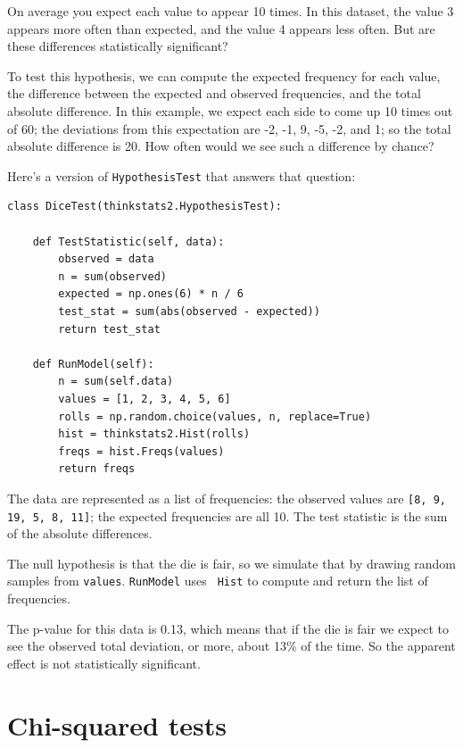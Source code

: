 \documentclass[12pt]{book}
\begin{document}
On average you expect each value to appear 10 times.  In this
dataset, the value 3 appears more often than expected, and the value 4
appears less often.  But are these differences statistically
significant?
   

To test this hypothesis, we can compute the expected frequency for
each value, the difference between the expected and observed
frequencies, and the total absolute difference.  In this
example, we expect each side to come up 10 times out of 60; the
deviations from this expectation are -2, -1, 9, -5, -2, and 1; so the
total absolute difference is 20.  How often would we see such a
difference by chance?

Here's a version of {\tt HypothesisTest} that answers that question:

\begin{verbatim}
class DiceTest(thinkstats2.HypothesisTest):

    def TestStatistic(self, data):
        observed = data
        n = sum(observed)
        expected = np.ones(6) * n / 6
        test_stat = sum(abs(observed - expected))
        return test_stat

    def RunModel(self):
        n = sum(self.data)
        values = [1, 2, 3, 4, 5, 6]
        rolls = np.random.choice(values, n, replace=True)
        hist = thinkstats2.Hist(rolls)
        freqs = hist.Freqs(values)
        return freqs
\end{verbatim}

The data are represented as a list of frequencies: the observed
values are {\tt [8, 9, 19, 5, 8, 11]}; the expected frequencies
are all 10.  The test statistic is the sum of the absolute differences.

The null hypothesis is that the die is fair, so we simulate that by
drawing random samples from {\tt values}.  {\tt RunModel} uses {\tt
  Hist} to compute and return the list of frequencies.

The p-value for this data is 0.13, which means that if the die is
fair we expect to see the observed total deviation, or more, about
13\% of the time.  So the apparent effect is not statistically
significant.
   


\section{Chi-squared tests}
\label{casino2}
\end{document}
